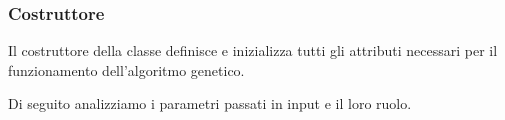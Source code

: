 \subsubsection*{Costruttore}
Il costruttore della classe definisce e inizializza tutti gli attributi necessari per il funzionamento dell'algoritmo genetico.


Di seguito analizziamo i parametri passati in input e il loro ruolo.

